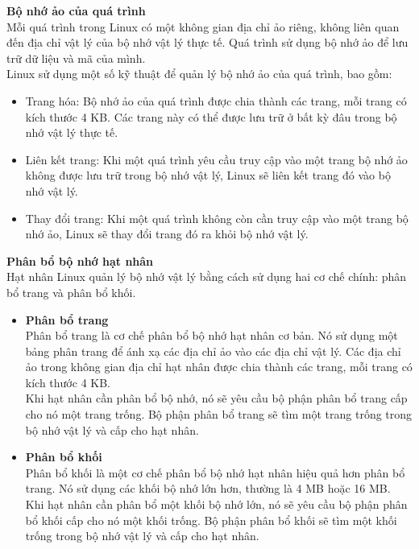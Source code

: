 \documentclass[12pt,a4paper]{article}
\begin{document}
\textbf{Bộ nhớ ảo của quá trình}\\

Mỗi quá trình trong Linux có một không gian địa chỉ ảo riêng, không liên quan đến địa chỉ vật lý của bộ nhớ vật lý thực tế. Quá trình sử dụng bộ nhớ ảo để lưu trữ dữ liệu và mã của mình.\\

Linux sử dụng một số kỹ thuật để quản lý bộ nhớ ảo của quá trình, bao gồm:

\begin{itemize}
	\item Trang hóa: Bộ nhớ ảo của quá trình được chia thành các trang, mỗi trang có kích thước 4 KB. Các trang này có thể được lưu trữ ở bất kỳ đâu trong bộ nhớ vật lý thực tế.
	\item Liên kết trang: Khi một quá trình yêu cầu truy cập vào một trang bộ nhớ ảo không được lưu trữ trong bộ nhớ vật lý, Linux sẽ liên kết trang đó vào bộ nhớ vật lý.
	\item Thay đổi trang: Khi một quá trình không còn cần truy cập vào một trang bộ nhớ ảo, Linux sẽ thay đổi trang đó ra khỏi bộ nhớ vật lý.
\end{itemize}

\textbf{Phân bổ bộ nhớ hạt nhân}\\

Hạt nhân Linux quản lý bộ nhớ vật lý bằng cách sử dụng hai cơ chế chính: phân bổ trang và phân bổ khối.\\

\begin{itemize}
	\item \textbf{Phân bổ trang}\\
	Phân bổ trang là cơ chế phân bổ bộ nhớ hạt nhân cơ bản. Nó sử dụng một bảng phân trang để ánh xạ các địa chỉ ảo vào các địa chỉ vật lý. Các địa chỉ ảo trong không gian địa chỉ hạt nhân được chia thành các trang, mỗi trang có kích thước 4 KB.\\
	
	Khi hạt nhân cần phân bổ bộ nhớ, nó sẽ yêu cầu bộ phận phân bổ trang cấp cho nó một trang trống. Bộ phận phân bổ trang sẽ tìm một trang trống trong bộ nhớ vật lý và cấp cho hạt nhân.\\
	\item \textbf{Phân bổ khối}\\
	Phân bổ khối là một cơ chế phân bổ bộ nhớ hạt nhân hiệu quả hơn phân bổ trang. Nó sử dụng các khối bộ nhớ lớn hơn, thường là 4 MB hoặc 16 MB.\\
	
	Khi hạt nhân cần phân bổ một khối bộ nhớ lớn, nó sẽ yêu cầu bộ phận phân bổ khối cấp cho nó một khối trống. Bộ phận phân bổ khối sẽ tìm một khối trống trong bộ nhớ vật lý và cấp cho hạt nhân.
\end{itemize}
\end{document}
